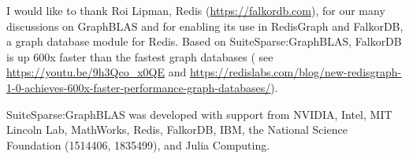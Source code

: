 I would like to thank Roi Lipman, Redis (\url{https://falkordb.com}), for
our many discussions on GraphBLAS and for enabling its use in RedisGraph and FalkorDB, a graph
database module for Redis.  Based on SuiteSparse:GraphBLAS, FalkorDB is up
600x faster than the fastest graph databases ({\footnotesize
see
\url{https://youtu.be/9h3Qco_x0QE} \newline
and
\url{https://redislabs.com/blog/new-redisgraph-1-0-achieves-600x-faster-performance-graph-databases/}}).

SuiteSparse:GraphBLAS was developed with support from
NVIDIA, Intel, MIT Lincoln Lab, MathWorks, Redis, FalkorDB, IBM,
the National Science Foundation (1514406, 1835499), and Julia Computing.

